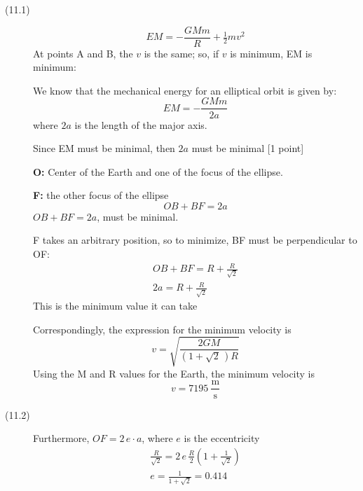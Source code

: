 \begin{description}
\item[(11.1)]
\begin{equation*}
EM = -\frac{GMm}{R} + \tfrac{1}{2}mv^2 \tag*{[1 point]}
\end{equation*}
At points A and B, the $v$ is the same; so, if $v$ is minimum, EM is minimum:

We know that the mechanical energy for an elliptical orbit is given by:
\begin{equation*}
EM = -\frac{GMm}{2a} \tag*{[1 point]}
\end{equation*}
where $2a$ is the length of the major axis.

Since EM must be minimal, then $2a$ must be minimal \hfill[1 point]

\textbf{O:} Center of the Earth and one of the focus of the ellipse.

\textbf{F:} the other focus of the ellipse
\begin{equation*}
OB + BF = 2a \tag*{[1 point]}
\end{equation*}
$OB + BF = 2a$, must be minimal.

F takes an arbitrary position, so to minimize, BF must be perpendicular to
OF:
\begin{gather*}
OB + BF = R + \frac{R}{\sqrt{2}} \tag*{[1 point]} \\
2a = R + \frac{R}{\sqrt{2}}
\end{gather*}
This is the minimum value it can take

Correspondingly, the expression for the minimum velocity is
\begin{equation*}
v = \sqrt{\frac{2GM}{(1 + \sqrt{2}\,)R}} \tag*{[1 point]}
\end{equation*}
Using the M and R values for the Earth, the minimum velocity is
\begin{equation*}
v = 7195\ \frac{\mathrm{m}}{\mathrm{s}} \tag*{[1 point]}
\end{equation*}

\item[(11.2)] Furthermore, $OF = 2\,e{\cdot}a$, where $e$ is the eccentricity
\begin{gather*}
\frac{R}{\sqrt{2}} = 2\,e\,\frac{R}{2}\left(1 + \frac{1}{\sqrt{2}}\right)
  \tag*{[2 points]} \\
e = \frac{1}{1 + \sqrt{2}} = 0.414 \tag*{[1 point]}
\end{gather*}
\end{description}

